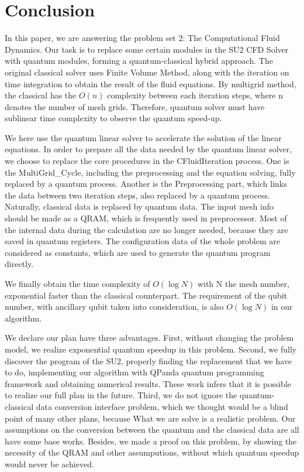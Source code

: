\documentclass[%
 reprint,
 amsmath,amssymb,
pra,
]{revtex4-1}
\begin{document}
\section{Conclusion}

In this paper, we are answering the problem set 2: The Computational Fluid Dynamics. Our task is to replace some certain modules in the SU2 CFD Solver with quantum modules, forming a quantum-classical hybrid approach. The original classical solver uses Finite Volume Method, along with the iteration on time integration to obtain the result of the fluid equations. By multigrid method, the classical has the $O(n)$ complexity between each iteration steps, where n denotes the number of mesh grids. Therefore, quantum solver must have sublinear time complexity to observe the quantum speed-up.

We here use the quantum linear solver to accelerate the solution of the linear equations. In order to prepare all the data needed by the quantum linear solver, we choose to replace the core procedures in the CFluidIteration process. One is the MultiGrid\_Cycle, including the preprocessing and the equation solving, fully replaced by a quantum process. Another is the Preprocessing part, which links the data between two iteration steps, also replaced by a quantum process. Naturally, classical data is replaced by quantum data. The input mesh info should be made as a QRAM, which is frequently used in preprocessor. Most of the internal data during the calculation are no longer needed, because they are saved in quantum registers. The configuration data of the whole problem are considered as constants, which are used to generate the quantum program directly.

We finally obtain the time complexity of $O(\log N)$ with N the mesh number, exponential faster than the classical counterpart. The requirement of the qubit number, with ancillary qubit taken into consideration, is also $O(\log N)$ in our algorithm.

We declare our plan have three advantages. First, without changing the problem model, we realize exponential quantum speedup in this problem. Second, we fully discover the program of the SU2, properly finding the replacement that we have to do, implementing our algorithm with QPanda quantum programming framework and obtaining numerical results. These work infers that it is possible to realize our full plan in the future. Third, we do not ignore the quantum-classical data conversion interface problem, which we thought would be a blind point of many other plans, because What we are solve is a realistic problem. Our assumptions on the conversion between the quantum and the classical data are all have some base works. Besides, we made a proof on this problem, by showing the necessity of the QRAM and other assumputions, without which quantum speedup would never be achieved.
\end{document}
